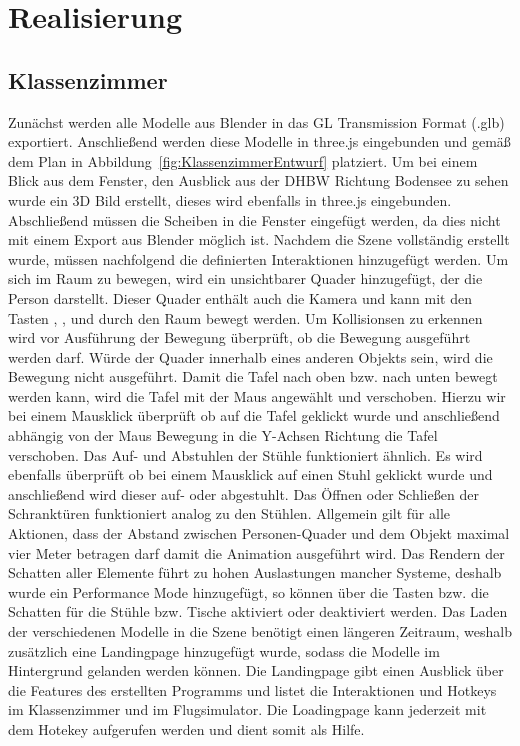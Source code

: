 \section{Realisierung}
\subsection{Klassenzimmer}
Zunächst werden alle Modelle aus Blender in das GL Transmission Format (.glb) exportiert.
Anschließend werden diese Modelle in three.js eingebunden und gemäß dem Plan in Abbildung~\ref{fig:KlassenzimmerEntwurf}
platziert.
Um bei einem Blick aus dem Fenster, den Ausblick aus der DHBW Richtung Bodensee zu sehen wurde ein 3D Bild erstellt,
dieses wird ebenfalls in three.js eingebunden.
Abschließend müssen die Scheiben in die Fenster eingefügt werden, da dies nicht mit einem Export aus Blender möglich ist.
\newparagraph
Nachdem die Szene vollständig erstellt wurde, müssen nachfolgend die definierten Interaktionen hinzugefügt werden.
Um sich im Raum zu bewegen, wird ein unsichtbarer Quader hinzugefügt, der die Person darstellt. Dieser Quader enthält auch die Kamera
und kann mit den Tasten , ,  und  durch den Raum bewegt werden. Um Kollisionsen zu erkennen wird vor Ausführung der Bewegung überprüft,
ob die Bewegung ausgeführt werden darf. 
Würde der Quader innerhalb eines anderen Objekts sein, wird die Bewegung nicht ausgeführt.
\newparagraph
Damit die Tafel nach oben bzw. nach unten bewegt werden kann, wird die Tafel mit der Maus angewählt und verschoben.
Hierzu wir bei einem Mausklick überprüft ob auf die Tafel geklickt wurde und anschließend abhängig von der Maus Bewegung in die Y-Achsen Richtung die Tafel verschoben.
Das Auf- und Abstuhlen der Stühle funktioniert ähnlich. Es wird ebenfalls überprüft ob bei einem Mausklick auf einen Stuhl geklickt wurde und anschließend wird dieser auf- oder abgestuhlt.
Das Öffnen oder Schließen der Schranktüren funktioniert analog zu den Stühlen.
Allgemein gilt für alle Aktionen, dass der Abstand zwischen Personen-Quader und dem Objekt maximal vier Meter betragen darf damit die Animation ausgeführt wird.
\newparagraph
Das Rendern der Schatten aller Elemente führt zu hohen Auslastungen mancher Systeme, deshalb wurde ein Performance Mode hinzugefügt, so können über die Tasten  bzw. 
die Schatten für die Stühle bzw. Tische aktiviert oder deaktiviert werden.
\newparagraph
Das Laden der verschiedenen Modelle in die Szene benötigt einen längeren Zeitraum, weshalb zusätzlich eine Landingpage hinzugefügt wurde, sodass die Modelle im Hintergrund gelanden werden können.
Die Landingpage gibt einen Ausblick über die Features des erstellten Programms und listet die Interaktionen und Hotkeys im Klassenzimmer und im Flugsimulator.
Die Loadingpage kann jederzeit mit dem Hotekey  aufgerufen werden und dient somit als Hilfe.
